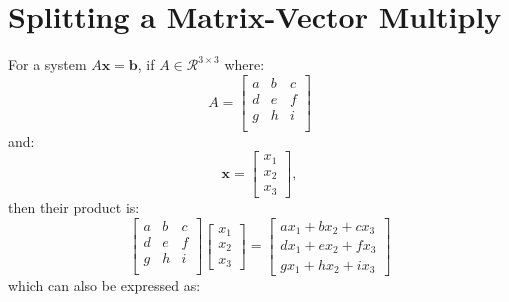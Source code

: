 \documentclass[ltr]{ornltm-app-mod} %
\numberwithin{equation}{section}
\begin{document}
    \appendix
    \acresetall %


    \section{Splitting a Matrix-Vector Multiply} \label{sec:matrix-vector-multiply}
    For a system $A\mathbf{x}=\mathbf{b}$, if $A\in \mathcal{R}^{3\times 3}$ where:
    \begin{equation}
        \label{eq:a-matrix}
        A = \begin{bmatrix}
                a & b & c \\
                d & e & f \\
                g & h & i \\
        \end{bmatrix}
    \end{equation}
    and:
    \begin{equation}
        \label{eq:x_vec}
        \mathbf{x} =
        \begin{bmatrix}
            x_1 \\
            x_2 \\
            x_3
        \end{bmatrix},
    \end{equation}
    then their product is:
    \begin{equation}
        \label{eq:ax-product}
        \begin{bmatrix}
            a & b & c \\
            d & e & f \\
            g & h & i \\
        \end{bmatrix}
        \begin{bmatrix}
            x_1 \\
            x_2 \\
            x_3
        \end{bmatrix}=
        \begin{bmatrix}
            ax_1+bx_2+cx_3 \\
            dx_1+ex_2+fx_3 \\
            gx_1+hx_2+ix_3
        \end{bmatrix}
    \end{equation}
    which can also be expressed as:
\end{document}
